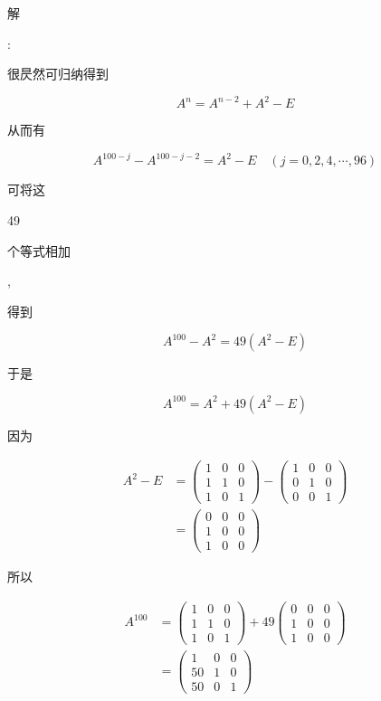 \documentclass[10pt]{article}
\begin{document}
\begin{CJK}{UTF8}{mj}解\end{CJK}: \begin{CJK}{UTF8}{mj}很昃然可归纳得到\end{CJK}
$$
A^{n}=A^{n-2}+A^{2}-E
$$
\begin{CJK}{UTF8}{mj}从而有\end{CJK}
$$
A^{100-j}-A^{100-j-2}=A^{2}-E \quad(j=0,2,4, \cdots, 96)
$$
\begin{CJK}{UTF8}{mj}可将这\end{CJK} 49 \begin{CJK}{UTF8}{mj}个等式相加\end{CJK}, \begin{CJK}{UTF8}{mj}得到\end{CJK}
$$
A^{100}-A^{2}=49\left(A^{2}-E\right)
$$
\begin{CJK}{UTF8}{mj}于是\end{CJK}
$$
A^{100}=A^{2}+49\left(A^{2}-E\right)
$$
\begin{CJK}{UTF8}{mj}因为\end{CJK}
$$
\begin{aligned}
A^{2}-E &=\left(\begin{array}{lll}
1 & 0 & 0 \\
1 & 1 & 0 \\
1 & 0 & 1
\end{array}\right)-\left(\begin{array}{lll}
1 & 0 & 0 \\
0 & 1 & 0 \\
0 & 0 & 1
\end{array}\right) \\
&=\left(\begin{array}{lll}
0 & 0 & 0 \\
1 & 0 & 0 \\
1 & 0 & 0
\end{array}\right)
\end{aligned}
$$
\begin{CJK}{UTF8}{mj}所以\end{CJK}
$$
\begin{aligned}
A^{100} &=\left(\begin{array}{lll}
1 & 0 & 0 \\
1 & 1 & 0 \\
1 & 0 & 1
\end{array}\right)+49\left(\begin{array}{lll}
0 & 0 & 0 \\
1 & 0 & 0 \\
1 & 0 & 0
\end{array}\right) \\
&=\left(\begin{array}{ccc}
1 & 0 & 0 \\
50 & 1 & 0 \\
50 & 0 & 1
\end{array}\right)
\end{aligned}
$$
\end{document}
